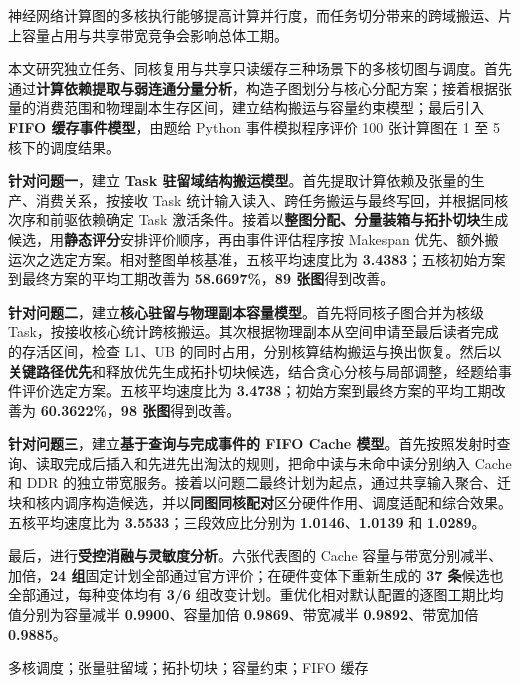 \noindent\hspace*{2em}神经网络计算图的多核执行能够提高计算并行度，而任务切分带来的跨域搬运、片上容量占用与共享带宽竞争会影响总体工期。

本文研究独立任务、同核复用与共享只读缓存三种场景下的多核切图与调度。首先通过\textbf{计算依赖提取与弱连通分量分析}，构造子图划分与核心分配方案；接着根据张量的消费范围和物理副本生存区间，建立结构搬运与容量约束模型；最后引入 \textbf{FIFO 缓存事件模型}，由题给 Python 事件模拟程序评价 100 张计算图在 1 至 5 核下的调度结果。

\textbf{针对问题一}，建立 \textbf{Task 驻留域结构搬运模型}。首先提取计算依赖及张量的生产、消费关系，按接收 Task 统计输入读入、跨任务搬运与最终写回，并根据同核次序和前驱依赖确定 Task 激活条件。接着以\textbf{整图分配、分量装箱与拓扑切块}生成候选，用\textbf{静态评分}安排评价顺序，再由事件评估程序按 Makespan 优先、额外搬运次之选定方案。相对整图单核基准，五核平均速度比为 \textbf{3.4383}；五核初始方案到最终方案的平均工期改善为 \textbf{58.6697\%}，\textbf{89 张图}得到改善。

\textbf{针对问题二}，建立\textbf{核心驻留与物理副本容量模型}。首先将同核子图合并为核级 Task，按接收核心统计跨核搬运。其次根据物理副本从空间申请至最后读者完成的存活区间，检查 L1、UB 的同时占用，分别核算结构搬运与换出恢复。然后以\textbf{关键路径优先}和释放优先生成拓扑切块候选，结合贪心分核与局部调整，经题给事件评价选定方案。五核平均速度比为 \textbf{3.4738}；初始方案到最终方案的平均工期改善为 \textbf{60.3622\%}，\textbf{98 张图}得到改善。

\textbf{针对问题三}，建立\textbf{基于查询与完成事件的 FIFO Cache 模型}。首先按照发射时查询、读取完成后插入和先进先出淘汰的规则，把命中读与未命中读分别纳入 Cache 和 DDR 的独立带宽服务。接着以问题二最终计划为起点，通过共享输入聚合、迁块和核内调序构造候选，并以\textbf{同图同核配对}区分硬件作用、调度适配和综合效果。五核平均速度比为 \textbf{3.5533}；三段效应比分别为 \textbf{1.0146}、\textbf{1.0139} 和 \textbf{1.0289}。

最后，进行\textbf{受控消融与灵敏度分析}。六张代表图的 Cache 容量与带宽分别减半、加倍，\textbf{24 组}固定计划全部通过官方评价；在硬件变体下重新生成的 \textbf{37 条}候选也全部通过，每种变体均有 \textbf{3/6} 组改变计划。重优化相对默认配置的逐图工期比均值分别为容量减半 \textbf{0.9900}、容量加倍 \textbf{0.9869}、带宽减半 \textbf{0.9892}、带宽加倍 \textbf{0.9885}。

多核调度；张量驻留域；拓扑切块；容量约束；FIFO 缓存
